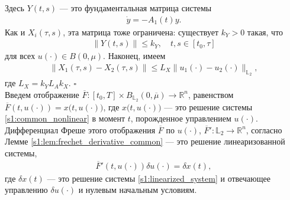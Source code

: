\documentclass[../main.tex]{subfiles}
\begin{document}
Здесь $Y(t,s)$ --- это фундаментальная матрица системы 
\begin{gather*}
 \dot{y} = -A_1(t) y.
\end{gather*}
Как и $X_i(\tau,s)$, эта матрица тоже ограничена: существует $k_Y>0$ такая, что
\begin{gather*}
 \|Y(t,s)\| \leqslant k_Y, \quad t,s \in [t_0, \tau]
\end{gather*}
для всех $u(\cdot) \in B(0,\mu)$.
Наконец, имеем 
\begin{gather*}
 \| X_1(\tau,s) - X_2(\tau,s) \| \leqslant L_X \| u_1(\cdot) - u_2(\cdot) \|_{\mathbb{L}_2}, 
\end{gather*} 
где $ L_X = k_Y L_A k_X$.
\hfill$\square$\\[1ex]%
Введем отображение $\overline{F}: [t_0,T] \times B_{\mathbb{L}_2}(0,\overline{\mu}) \to \mathbb{R}^n$, равенством $\overline{F}(t, u(\cdot)) = x \big(t, u(\cdot)\big) $, где $x \big(t, u(\cdot)\big)$ --- это решение системы \eqref{s1:common_nonlinear} в момент $t$, порожденное управлением $u(\cdot)$.
Дифференциал Фреше этого отображения $\overline{F}$ по $u(\cdot)$, $\overline{F}': \mathbb{L}_2 \to \mathbb{R}^n $, согласно Лемме \ref{s1:lem:frechet_derivative_common} --- это решение линеаризованной системы, 
\begin{gather*}%
 \overline{F}'(t, u(\cdot)) \delta u(\cdot) = \delta x(t), 
\end{gather*}
где $\delta x(t)$ --- это решение системы \eqref{s1:linearized_system} и отвечающее управлению $\delta u(\cdot)$ и нулевым начальным условиям.
 
\end{document}
